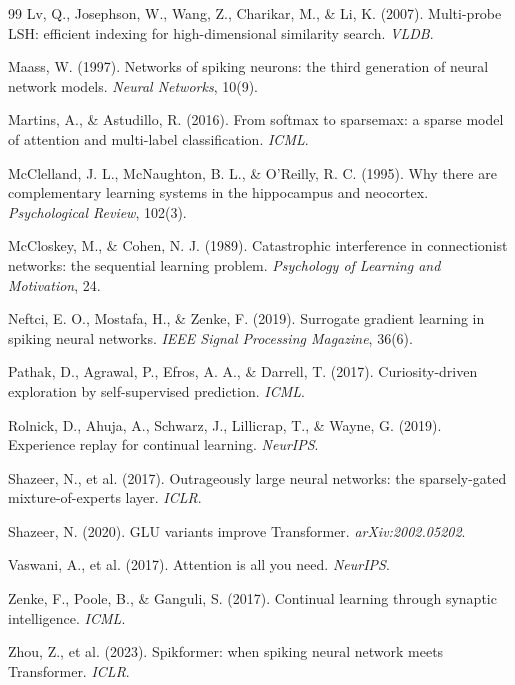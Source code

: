 \documentclass[10pt,twocolumn]{article}
\begin{document}
\begin{thebibliography}{99}
 Lv, Q., Josephson, W., Wang, Z., Charikar, M., \& Li, K.
(2007). Multi-probe LSH: efficient indexing for high-dimensional similarity
search. \emph{VLDB}.

 Maass, W. (1997). Networks of spiking neurons: the third
generation of neural network models. \emph{Neural Networks}, 10(9).

 Martins, A., \& Astudillo, R. (2016). From softmax to
sparsemax: a sparse model of attention and multi-label classification.
\emph{ICML}.

 McClelland, J. L., McNaughton, B. L., \& O'Reilly, R.
C. (1995). Why there are complementary learning systems in the hippocampus and
neocortex. \emph{Psychological Review}, 102(3).

 McCloskey, M., \& Cohen, N. J. (1989). Catastrophic
interference in connectionist networks: the sequential learning problem.
\emph{Psychology of Learning and Motivation}, 24.

 Neftci, E. O., Mostafa, H., \& Zenke, F. (2019). Surrogate
gradient learning in spiking neural networks. \emph{IEEE Signal Processing
Magazine}, 36(6).

 Pathak, D., Agrawal, P., Efros, A. A., \& Darrell, T.
(2017). Curiosity-driven exploration by self-supervised prediction.
\emph{ICML}.

 Rolnick, D., Ahuja, A., Schwarz, J., Lillicrap, T., \&
Wayne, G. (2019). Experience replay for continual learning. \emph{NeurIPS}.

 Shazeer, N., et al. (2017). Outrageously large neural
networks: the sparsely-gated mixture-of-experts layer. \emph{ICLR}.

 Shazeer, N. (2020). GLU variants improve Transformer.
\emph{arXiv:2002.05202}.

 Vaswani, A., et al. (2017). Attention is all you need.
\emph{NeurIPS}.

 Zenke, F., Poole, B., \& Ganguli, S. (2017). Continual
learning through synaptic intelligence. \emph{ICML}.

 Zhou, Z., et al. (2023). Spikformer: when spiking neural
network meets Transformer. \emph{ICLR}.

\end{thebibliography}
\end{document}
